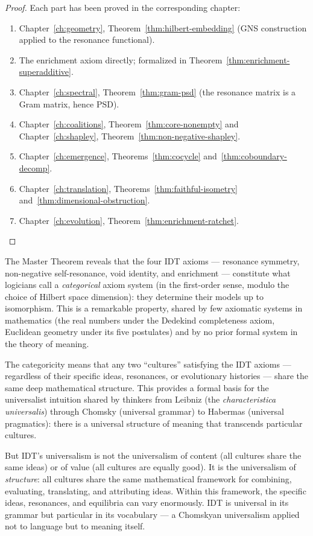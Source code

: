 \begin{proof}
Each part has been proved in the corresponding chapter:
\begin{enumerate}
\item Chapter~\ref{ch:geometry}, Theorem~\ref{thm:hilbert-embedding}
  (GNS construction applied to the resonance functional).
\item The enrichment axiom directly; formalized in
  Theorem~\ref{thm:enrichment-superadditive}.
\item Chapter~\ref{ch:spectral}, Theorem~\ref{thm:gram-psd} (the resonance
  matrix is a Gram matrix, hence PSD).
\item Chapter~\ref{ch:coalitions}, Theorem~\ref{thm:core-nonempty} and
  Chapter~\ref{ch:shapley}, Theorem~\ref{thm:non-negative-shapley}.
\item Chapter~\ref{ch:emergence}, Theorems~\ref{thm:cocycle}
  and~\ref{thm:coboundary-decomp}.
\item Chapter~\ref{ch:translation},
  Theorems~\ref{thm:faithful-isometry}
  and~\ref{thm:dimensional-obstruction}.
\item Chapter~\ref{ch:evolution}, Theorem~\ref{thm:enrichment-ratchet}.
\end{enumerate}
\end{proof}

\begin{interpretation}
\label{interp:ch22:master_theorem_commentary}
The Master Theorem reveals that the four IDT axioms --- resonance symmetry,
non-negative self-resonance, void identity, and enrichment --- constitute
what logicians call a \emph{categorical} axiom system (in the first-order
sense, modulo the choice of Hilbert space dimension): they determine their
models up to isomorphism.  This is a remarkable property, shared by few
axiomatic systems in mathematics (the real numbers under the Dedekind
completeness axiom, Euclidean geometry under its five postulates) and by
no prior formal system in the theory of meaning.

The categoricity means that any two ``cultures'' satisfying the IDT axioms
--- regardless of their specific ideas, resonances, or evolutionary
histories --- share the same deep mathematical structure.  This provides a
formal basis for the universalist intuition shared by thinkers from
Leibniz (the \textit{characteristica universalis}) through Chomsky
(universal grammar) to Habermas (universal pragmatics): there is a
universal structure of meaning that transcends particular cultures.

But IDT's universalism is not the universalism of content (all cultures
share the same ideas) or of value (all cultures are equally good).  It is
the universalism of \emph{structure}: all cultures share the same
mathematical framework for combining, evaluating, translating, and
attributing ideas.  Within this framework, the specific ideas, resonances,
and equilibria can vary enormously.  IDT is universal in its grammar but
particular in its vocabulary --- a Chomskyan universalism applied not to
language but to meaning itself.
\end{interpretation}

